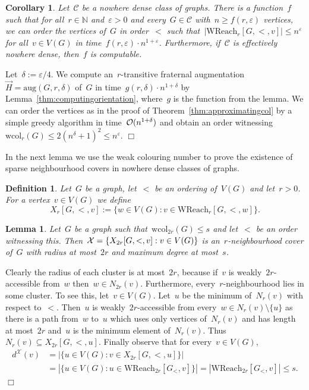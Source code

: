 \documentclass[11pt]{article}
\newtheorem{lemma}[theorem]{Lemma}
\newtheorem{corollary}[theorem]{Corollary}
\newtheorem{definition}[theorem]{Definition}
\numberwithin{equation}{section}
\newcommand{\N}{{\mathbb N}} \newcommand{\Q}{{\mathbb Q}}
\newcommand{\CCC}{\mathcal{C}} \newcommand{\DDD}{\mathcal{D}}
\newcommand{\Oof}{\mbox{$\cal O$}}
\newcommand{\aug}{\mathrm{aug}}
\newcommand{\wcol}{\mathrm{wcol}}
\newcommand{\wreach}{\mathrm{WReach}}
\renewcommand{\epsilon}{\varepsilon}
\def\qed{\hspace*{\fill}$\Box$}
\newenvironment{proof}[1][]%
{\ifthenelse{\equal{#1}{}}{\noindent\textit{Proof.
    }}{\noindent\textit{#1. }}}%
{\qed\par\smallskip}
\begin{document}
\begin{corollary}\label{thm:order}
  Let~$\CCC$ be a nowhere dense class of graphs. There is a
  function~$f$ such that for all~$r\in\N$ and~$\epsilon>0$ and
  every~$G\in\CCC$ with~$n\geq f(r,\epsilon)$ vertices, we can order
  the vertices of~$G$ in order~$<$ such that~$|\wreach_r[G,<, v]|\leq
  n^\epsilon$ for all~$v\in V(G)$ in time~$f(r,\epsilon)\cdot
  n^{1+\epsilon}$. Furthermore, if~$\CCC$ is effectively nowhere
  dense, then~$f$ is computable.
\end{corollary}

\begin{proof}
  Let~$\delta:=\epsilon/4$. We compute an~$r$-transitive fraternal
  augmentation~$\vec{H}=\aug(G,r, \delta)$ of~$G$ in
  time~$g(r,\delta)\cdot n^{1+\delta}$ by
  Lemma~\ref{thm:computingorientation}, where~$g$ is the function from
  the lemma. We can order the vertices as in the proof of
  Theorem~\ref{thm:approximatingcol} by a simple greedy algorithm in
  time~$\Oof(n^{1+\delta})$ and obtain an order
  witnessing~$\wcol_r(G)\leq 2(n^{\delta}+1)^2\leq n^\epsilon$.
\end{proof}

In the next lemma we use the weak colouring number to prove the
existence of sparse neighbourhood covers in nowhere dense classes of
graphs.  

\begin{definition}
  Let~$G$ be a graph, let~$<$ be an ordering of~$V(G)$ and
  let~$r>0$. For a vertex~$v\in V(G)$ we define
  \[X_{r}[G,<,v] := \{w\in V(G) : v\in \wreach_{r}[G,<,w]\}.\]
\end{definition}

\begin{lemma}\label{thm:covers}
  Let~$G$ be a graph such that~$\mathrm{wcol}_{2r}(G)\leq s$ and
  let~$<$ be an order witnessing this. Then~$\mathcal{X}=\{X_{2r}[G,<,v] :
  v\in V(G)\}$ is an~$r$-neighbourhood cover of~$G$ with radius at
  most~$2r$ and maximum degree at most~$s$.
\end{lemma}
\begin{proof}
  Clearly the radius of each cluster is at most~$2r$, because if~$v$
  is weakly~$2r$-accessible from~$w$ then~$w\in
  N_{2r}(v)$. Furthermore, every~$r$-neighbourhood lies in some
  cluster. To see this, let~$v\in V(G)$. Let~$u$ be the minimum
  of~$N_r(v)$ with respect to~$<$. Then~$u$ is weakly~$2r$-accessible
  from every~$w\in N_r(v)\setminus\{u\}$ as there is a path from~$w$
  to~$u$ which uses only vertices of~$N_r(v)$ and has length at
  most~$2r$ and~$u$ is the minimum element
  of~$N_r(v)$. Thus~$N_r(v)\subseteq X_{2r}[G,<,u]$. Finally observe
  that for every~$v\in V(G)$,
 \begin{align*}
   d^\mathcal{X}(v) &= |\{u\in V(G) : v\in X_{2r}[G,<,u]\}|\\ &=
   |\{u\in V(G) : u\in \wreach_{2r}[G_<, v]\}| = |\wreach_{2r}[G_<,v]|\leq s.
 \end{align*}
\end{proof}
\end{document}

